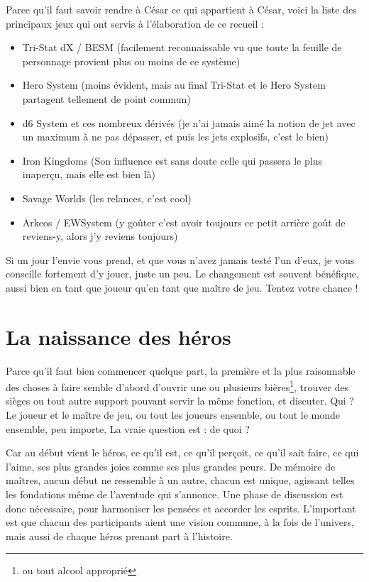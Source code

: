 \documentclass[11pt,oneside]{book}
\begin{document}
\begin{multicols}{2}
        Parce qu'il faut savoir rendre à César ce qui appartient à César, voici la liste des principaux jeux qui ont servis à l'élaboration de ce recueil :

        \begin{itemize}
            \item Tri-Stat dX / BESM (facilement reconnaissable vu que toute la feuille de personnage provient plus ou moins de ce système)
            \item Hero System (moins évident, mais au final Tri-Stat et le Hero System partagent tellement de point commun)
            \item d6 System et ces nombreux dérivés (je n'ai jamais aimé la notion de jet avec un maximum à ne pas dépasser, et puis les jets explosifs, c'est le bien)
            \item Iron Kingdoms (Son influence est sans doute celle qui passera le plus inaperçu, mais elle est bien là)
            \item Savage Worlds (les relances, c'est cool)
            \item Arkeos / EWSystem (y goûter c'est avoir toujours ce petit arrière goût de reviens-y, alors j'y reviens toujours)
        \end{itemize}

        Si un jour l'envie vous prend, et que vous n'avez jamais testé l'un d'eux, je vous conseille fortement d'y jouer, juste un peu. Le changement est souvent bénéfique, aussi bien en tant que joueur qu'en tant que maître de jeu. Tentez votre chance !

    \section{La naissance des héros}

        Parce qu'il faut bien commencer quelque part, la première et la plus raisonnable des choses à faire semble d'abord d'ouvrir une ou plusieurs bières\footnote{ou tout alcool approprié}, trouver des sièges ou tout autre support pouvant servir la même fonction, et discuter. Qui ? Le joueur et le maître de jeu, ou tout les joueurs ensemble, ou tout le monde ensemble, peu importe. La vraie question est : de quoi ?

        Car au début vient le héros, ce qu'il est, ce qu'il perçoit, ce qu'il sait faire, ce qui l'aime, ses plus grandes joies comme ses plus grandes peurs. De mémoire de maîtres, aucun début ne ressemble à un autre, chacun est unique, agissant telles les fondations même de l'aventude qui s'annonce. Une phase de discussion est donc nécessaire, pour harmoniser les pensées et accorder les esprits. L'important est que chacun des participants aient une vision commune, à la fois de l'univers, mais aussi de chaque héros prenant part à l'histoire.


\end{multicols}
\end{document}
